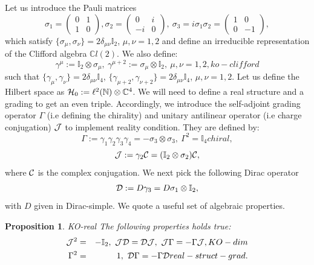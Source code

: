 \documentclass[10pt]{book}
\theoremstyle{break}
\newtheorem{proposition}{Proposition}
\begin{document}
Let us introduce the Pauli matrices
\begin{equation}
\sigma_1=\begin{pmatrix}
0&1\\ 
1&0
\end{pmatrix}, \sigma_2=\begin{pmatrix}
0&i\\ 
-i&0
\end{pmatrix},\ \sigma_3=i\sigma_1\sigma_2=\begin{pmatrix}
1&0\\
0&-1\end{pmatrix},
\end{equation}
which satisfy $\{\sigma_\mu,\sigma_\nu\}=2\delta_{\mu\nu}\mathbb{I}_2$, $\mu,\nu=1,2$ and define an irreducible representation of the Clifford algebra $\mathbb{C}l(2)$. We also define:
\begin{equation}
\gamma^\mu:=\mathbb{I}_2\otimes\sigma_\mu,\ \gamma^{\mu+2}:=\sigma_\mu\otimes\mathbb{I}_2,\ \mu,\nu=1,2,{ko-clifford}
\end{equation}
such that $\{\gamma_\mu,\gamma_\nu \}=2\delta_{\mu\nu}\mathbb{I}_4$, $\{\gamma_{\mu+2},\gamma_{\nu+2} \}=2\delta_{\mu\nu}\mathbb{I}_4$, $\mu,\nu=1,2$. Let us define the Hilbert space as ${\cal{H}}_0:=\ell^2(\mathbb{N})\otimes\mathbb{C}^4$. We will need to define a real structure and a grading to get an even triple. Accordingly, we introduce the self-adjoint grading operator $\Gamma$ (i.e defining the chirality) and unitary antilinear operator (i.e charge conjugation) ${\cal{J}}$ to implement reality condition. They are defined by:
\begin{equation}
\Gamma:=\gamma_1\gamma_2\gamma_3\gamma_4=-\sigma_3\otimes\sigma_3,\ \Gamma^2=\mathbb{I}_4{chiral},
\end{equation}
\begin{equation}
{\cal{J}}:=\gamma_2{\cal{C}}=(\mathbb{I}_2\otimes\sigma_2){\cal{C}},
\end{equation}
where ${\cal{C}}$ is the complex conjugation. We next pick the following Dirac operator
\begin{equation}
{\cal{D}}:=D\gamma_3=D\sigma_1\otimes\mathbb{I}_2,
\end{equation}
with $D$ given in {Dirac-simple}. We quote a useful set of algebraic properties.
\begin{proposition}{KO-real}
The following properties holds true:
\begin{eqnarray}
{\cal{J}}^2&=&-\mathbb{I}_2,\ {\cal{J}}{\cal{D}}={\cal{D}}{\cal{J}},\ {\cal{J}}\Gamma=-\Gamma{\cal{J}},{KO-dim}\\ 
\Gamma^2&=&1,\ {\cal{D}}\Gamma=-\Gamma{\cal{D}}{real-struct-grad}.
\end{eqnarray}
\end{proposition}
\end{document}
